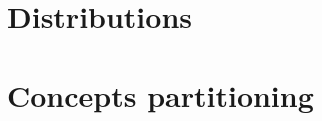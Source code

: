 \appendix

\chapter{Distributions}
\label{app:distributions}

\begin{figure}[H]
\centering
\end{figure}

\chapter{Concepts partitioning}
\label{app:concept_partition}


\begin{figure}[H]
\centering
\end{figure}
